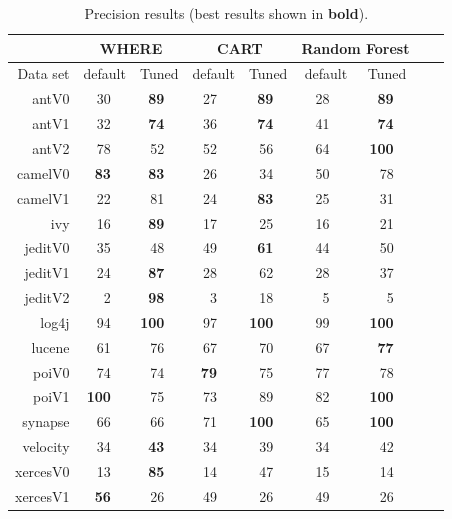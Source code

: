\documentclass{sig-alternative}
\begin{document}
\begin{table}[!tb]
\renewcommand{\baselinestretch}{0.8} 

\scriptsize    

\begin{tabular}{r|rl|rl|rl|rl|rl|rlrl}
      &   \multicolumn{4}{c|}{WHERE}         &   \multicolumn{4}{c|}{CART}         &   \multicolumn{4}{c}{Random Forest}         \\\hline
  Data set   &   \multicolumn{2}{c}{default}         &   \multicolumn{2}{c|}{Tuned}         &   \multicolumn{2}{c}{default}         &   \multicolumn{2}{c|}{Tuned}    &   \multicolumn{2}{c}{default}  &   \multicolumn{2}{c}{Tuned}\\\hline
antV0 & 30 &   & {\bf 89} &   & 27 &   & {\bf 89} &   & 28 &   & {\bf 89} &  \\
antV1 & 32 &   & {\bf 74} &   & 36 &   & {\bf 74} &   & 41 &   & {\bf 74} &  \\
antV2 & 78 &   & 52 &   & 52 &   & 56 &   & 64 &   & {\bf 100} &  \\
camelV0 & {\bf 83} &   & {\bf 83} &   & 26 &   & 34 &   & 50 &   & 78 &  \\
camelV1 & 22 &   & 81 &   & 24 &   & {\bf 83} &   & 25 &   & 31 &  \\
ivy & 16 &   & {\bf 89} &   & 17 &   & 25 &   & 16 &   & 21 &  \\
jeditV0 & 35 &   & 48 &   & 49 &   & {\bf 61} &   & 44 &   & 50 &  \\
jeditV1 & 24 &   & {\bf 87} &   & 28 &   & 62 &   & 28 &   & 37 &  \\
jeditV2 & 2 &   & {\bf 98} &   & 3 &   & 18 &   & 5 &   & 5 &  \\
log4j & 94 &   & {\bf 100} &   & 97 &   & {\bf 100} &   & 99 &   & {\bf 100} &  \\
lucene & 61 &   & 76 &   & 67 &   & 70 &   & 67 &   & {\bf 77} &  \\
poiV0 & 74 &   & 74 &   & {\bf 79} &   & 75 &   & 77 &   & 78 &  \\
poiV1 & {\bf 100} &   & 75 &   & 73 &   & 89 &   & 82 &   & {\bf 100} &  \\
synapse & 66 &   & 66 &   & 71 &   & {\bf 100} &   & 65 &   & {\bf 100} &  \\
velocity & 34 &   & {\bf 43} &   & 34 &   & 39 &   & 34 &   & 42 &  \\
xercesV0 & 13 &   & {\bf 85} &   & 14 &   & 47 &   & 15 &   & 14 &  \\
xercesV1 & {\bf 56} &   & 26 &   & 49 &   & 26 &   & 49 &   & 26 &  \\
\end{tabular}
\caption{Precision results (best results  shown in {\bf bold}).}
\label{tab:precisionbars}
\end{table}
\end{document}

